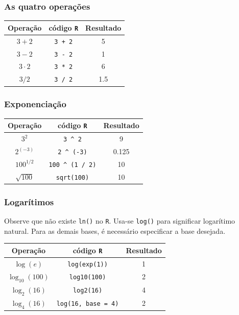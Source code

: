 \documentclass[
]{book}
\begin{document}
\hypertarget{as-quatro-operauxe7uxf5es}{%
\subsubsection*{As quatro operações}\label{as-quatro-operauxe7uxf5es}}

\begin{longtable}[]{@{}ccc@{}}
\toprule
Operação & código \texttt{R} & Resultado\tabularnewline
\midrule
\endhead
\(3 + 2\) & \texttt{3\ +\ 2} & 5\tabularnewline
\(3 - 2\) & \texttt{3\ -\ 2} & 1\tabularnewline
\(3 \cdot2\) & \texttt{3\ *\ 2} & 6\tabularnewline
\(3 / 2\) & \texttt{3\ /\ 2} & 1.5\tabularnewline
\bottomrule
\end{longtable}

\hypertarget{exponenciauxe7uxe3o}{%
\subsubsection*{Exponenciação}\label{exponenciauxe7uxe3o}}

\begin{longtable}[]{@{}ccc@{}}
\toprule
Operação & código \texttt{R} & Resultado\tabularnewline
\midrule
\endhead
\(3^2\) & \texttt{3\ \^{}\ 2} & 9\tabularnewline
\(2^{(-3)}\) & \texttt{2\ \^{}\ (-3)} & 0.125\tabularnewline
\(100^{1/2}\) & \texttt{100\ \^{}\ (1\ /\ 2)} & 10\tabularnewline
\(\sqrt{100}\) & \texttt{sqrt(100)} & 10\tabularnewline
\bottomrule
\end{longtable}

\hypertarget{logaruxedtimos}{%
\subsubsection*{Logarítimos}\label{logaruxedtimos}}

Observe que não existe \texttt{ln()} no \texttt{R}. Usa-se \texttt{log()} para significar logarítimo natural. Para as demais bases, é necessário especificar a base desejada.

\begin{longtable}[]{@{}ccc@{}}
\toprule
Operação & código \texttt{R} & Resultado\tabularnewline
\midrule
\endhead
\(\log(e)\) & \texttt{log(exp(1))} & 1\tabularnewline
\(\log_{10}(100)\) & \texttt{log10(100)} & 2\tabularnewline
\(\log_{2}(16)\) & \texttt{log2(16)} & 4\tabularnewline
\(\log_{4}(16)\) & \texttt{log(16,\ base\ =\ 4)} & 2\tabularnewline
\bottomrule
\end{longtable}
\end{document}
